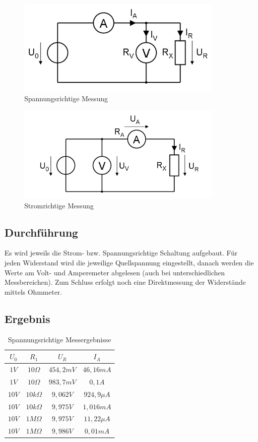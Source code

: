 \documentclass[12pt,a4paper,titlepage]{article}
\begin{document}
\begin{figure}[H]
  \centering
  \label{Figure2.3.1}
  \includegraphics[width=100mm]{spannungsrichtig.png}
  \caption{Spannungsrichtige Messung}
\end{figure}

\begin{figure}[H]
  \centering
  \label{Figure2.3.2}
  \includegraphics[width=100mm]{stromrichtig.png}
  \caption{Stromrichtige Messung}
\end{figure}


\subsection{Durchführung}
Es wird jeweils die Strom- bzw. Spannungsrichtige Schaltung aufgebaut. Für jeden Widerstand wird die jeweilige Quellspannung eingestellt, danach werden die Werte am Volt- und Amperemeter abgelesen (auch bei unterschiedlichen Messbereichen). Zum Schluss erfolgt noch eine Direktmessung der Widerstände mittels Ohmmeter.

\subsection{Ergebnis}
\begin{table}[H]
  \centering
  \label{Figure2.5.1}
  \begin{tabular}{|c|c|c|c|}
    \hline
    $U_0$ & $R_1$ & $U_R$ & $I_A$ \\
    \hline
    $1V$ & $10\Omega$ & $454,2mV$ & $46,16mA$ \\
    \hline
    $1V$ & $10\Omega$ & $983,7mV$ & $0,1A$ \\
    \hline
    $10V$ & $10k\Omega$ & $9,062V$ & $924,9\mu A$ \\
    \hline
    $10V$ & $10k\Omega$ & $9,975V$ & $1,016mA$ \\
    \hline
    $10V$ & $1M\Omega$ & $9,975V$ & $11,22\mu A$ \\
    \hline
    $10V$ & $1M\Omega$ & $9,986V$ & $0,01mA$ \\
    \hline
  \end{tabular}
  \caption{Spannungsrichtige Messergebnisse}
\end{table}
\end{document}
